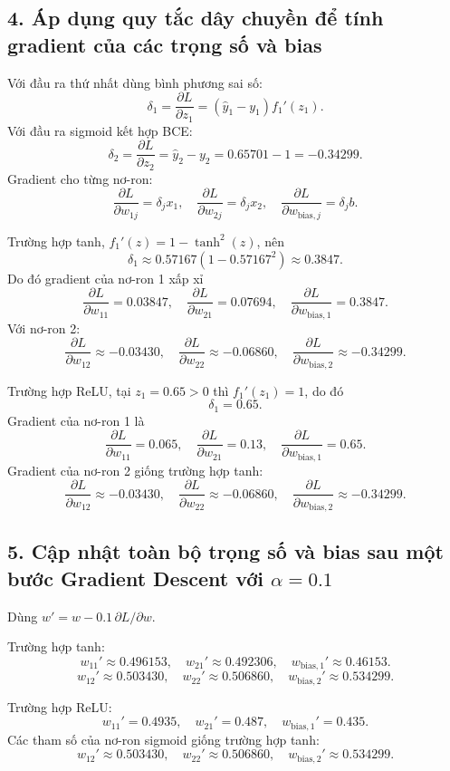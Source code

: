 \documentclass[12pt,a4paper]{article}
\begin{document}
\subsection*{4. Áp dụng quy tắc dây chuyền để tính gradient của các trọng số và bias}

 Với đầu ra thứ nhất dùng bình phương sai số:
\[
\delta_1=\frac{\partial L}{\partial z_1}
=(\hat y_1-y_1)f_1'(z_1).
\]
Với đầu ra sigmoid kết hợp BCE:
\[
\delta_2=\frac{\partial L}{\partial z_2}=\hat y_2-y_2
=0.65701-1=-0.34299.
\]
Gradient cho từng nơ-ron:
\[
\frac{\partial L}{\partial w_{1j}}=\delta_jx_1,\quad
\frac{\partial L}{\partial w_{2j}}=\delta_jx_2,\quad
\frac{\partial L}{\partial w_{\mathrm{bias},j}}=\delta_jb.
\]

Trường hợp tanh, $f_1'(z)=1-\tanh^2(z)$, nên
\[
\delta_1\approx0.57167(1-0.57167^2)\approx0.3847.
\]
Do đó gradient của nơ-ron 1 xấp xỉ
\[
\frac{\partial L}{\partial w_{11}}=0.03847,\quad
\frac{\partial L}{\partial w_{21}}=0.07694,\quad
\frac{\partial L}{\partial w_{\mathrm{bias},1}}=0.3847.
\]
Với nơ-ron 2:
\[
\frac{\partial L}{\partial w_{12}}\approx-0.03430,\quad
\frac{\partial L}{\partial w_{22}}\approx-0.06860,\quad
\frac{\partial L}{\partial w_{\mathrm{bias},2}}\approx-0.34299.
\]

Trường hợp ReLU, tại $z_1=0.65>0$ thì $f_1'(z_1)=1$, do đó
\[
\delta_1=0.65.
\]
Gradient của nơ-ron 1 là
\[
\frac{\partial L}{\partial w_{11}}=0.065,\quad
\frac{\partial L}{\partial w_{21}}=0.13,\quad
\frac{\partial L}{\partial w_{\mathrm{bias},1}}=0.65.
\]
Gradient của nơ-ron 2 giống trường hợp tanh:
\[
\frac{\partial L}{\partial w_{12}}\approx-0.03430,\quad
\frac{\partial L}{\partial w_{22}}\approx-0.06860,\quad
\frac{\partial L}{\partial w_{\mathrm{bias},2}}\approx-0.34299.
\]

\subsection*{5. Cập nhật toàn bộ trọng số và bias sau một bước Gradient Descent với $\alpha=0.1$}

 Dùng $w'=w-0.1\,\partial L/\partial w$.

Trường hợp tanh:
\[
w_{11}'\approx0.496153,\quad w_{21}'\approx0.492306,\quad
w_{\mathrm{bias},1}'\approx0.46153.
\]
\[
w_{12}'\approx0.503430,\quad w_{22}'\approx0.506860,\quad
w_{\mathrm{bias},2}'\approx0.534299.
\]

Trường hợp ReLU:
\[
w_{11}'=0.4935,\quad w_{21}'=0.487,\quad
w_{\mathrm{bias},1}'=0.435.
\]
Các tham số của nơ-ron sigmoid giống trường hợp tanh:
\[
w_{12}'\approx0.503430,\quad w_{22}'\approx0.506860,\quad
w_{\mathrm{bias},2}'\approx0.534299.
\]
\end{document}
